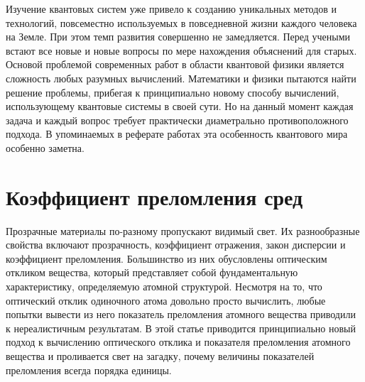 \documentclass[a4paper, 14pt]{extarticle}
\begin{document}
Изучение квантовых систем уже привело к созданию уникальных методов 
и технологий, повсеместно используемых в повседневной жизни каждого 
человека на Земле. При этом темп развития совершенно не замедляется. 
Перед учеными встают все новые и новые вопросы по мере нахождения 
объяснений для старых. Основой проблемой современных работ в области 
квантовой физики является сложность любых разумных вычислений. 
Математики и физики пытаются найти решение проблемы, прибегая 
к принципиально новому способу вычислений, использующему квантовые 
системы в своей сути. Но на данный момент каждая задача и каждый вопрос 
требует практически диаметрально противоположного подхода. В упоминаемых 
в реферате работах эта особенность квантового мира особенно заметна.


\clearpage \section{Коэффициент преломления сред}

Прозрачные материалы по-разному пропускают видимый свет. Их 
разнообразные свойства включают прозрачность, коэффициент отражения, 
закон дисперсии и коэффициент преломления. Большинство из них 
обусловлены оптическим откликом вещества, который представляет собой 
фундаментальную характеристику, определяемую атомной структурой. 
Несмотря на то, что оптический отклик одиночного атома довольно просто 
вычислить, любые попытки вывести из него показатель преломления атомного 
вещества приводили к нереалистичным результатам. В этой статье 
приводится принципиально новый подход к вычислению оптического отклика 
и показателя преломления атомного вещества и проливается свет на 
загадку, почему величины показателей преломления всегда порядка единицы.


\end{document}
